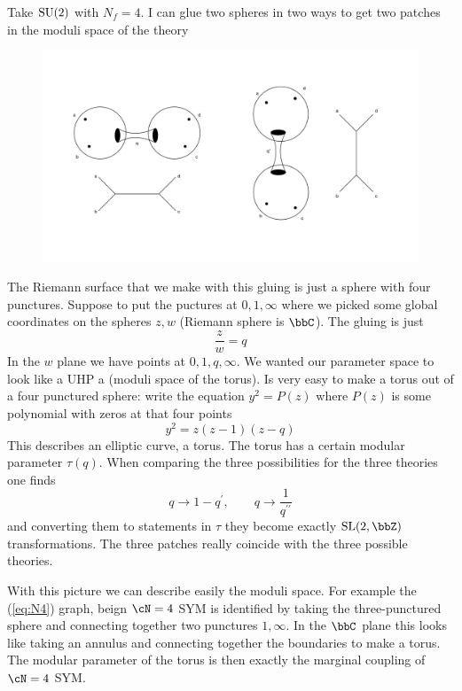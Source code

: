 Take $\mathrm{SU}(2)$ with $N_{f}=4$. I can glue two spheres in two ways to get two patches in the moduli space of the theory
\begin{figure}[H]
\includegraphics[width=\textwidth]{su2.pdf}
\end{figure}
The Riemann surface that we make with this gluing is just a sphere with four punctures. Suppose to put the puctures at $0,1,\infty$ where we picked some global coordinates on the spheres $z,w$ (Riemann sphere is $\bbC$). The gluing is just 
\begin{equation}
	\frac{z}{w}=q
\end{equation}
In the $w$ plane we have points at $0,1,q,\infty$. We wanted our parameter space to look like a UHP a (moduli space of the torus). Is very easy to make a torus out of a four punctured sphere: write the equation $y^{2}=P(z)$ where $P(z)$ is some polynomial with zeros at that four points
\begin{equation}
	y^{2}=z(z-1)(z-q)
\end{equation}
This describes an elliptic curve, a torus. The torus has a certain modular parameter $\tau(q)$. When comparing the three possibilities for the three theories one finds
\begin{equation}
	q\rightarrow1-q^{\prime},\qquad q\rightarrow\frac{1}{q^{\prime\prime}}
\end{equation}
and converting them to statements in $\tau$ they become exactly $\SL(2,\bbZ)$ transformations. The three patches really coincide with the three possible theories.

With this picture we can describe easily the moduli space. For example the (\ref{eq:N4}) graph, beign $\cN=4$ SYM is identified by taking the three-punctured sphere and connecting together two punctures $1,\infty$. In the $\bbC$ plane this looks like taking an annulus and connecting together the boundaries to make a torus. The modular parameter of the torus is then exactly the marginal coupling of $\cN=4$ SYM.

